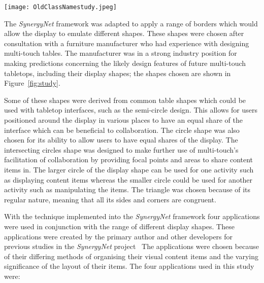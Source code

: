 \documentclass[review,5p,times,twocolumn]{elsarticle}
\begin{document}
\begin{figure*}[t!] 
	\centerline{\texttt{[image: OldClassNamestudy.jpeg]}}
	\caption{Several applications in use with different display shapes during the study.}
	\label{fig:study}
\end{figure*}

The {\emph{SynergyNet}} framework was adapted to apply a range of borders which would allow the display to emulate different shapes.
These shapes were chosen after consultation with a furniture manufacturer who had experience with designing multi-touch tables.
The manufacturer was in a strong industry position for making
predictions concerning the likely design features of future multi-touch tabletops, including their display shapes; the shapes chosen are shown in Figure~\ref{fig:study}.

Some of these shapes were derived from common table shapes which could be used with tabletop interfaces, such as the semi-circle design.
This allows for users positioned around the display in various places to have an equal share of the interface which can be beneficial to collaboration.
The circle shape was also chosen for its ability to allow users to have equal shares of the display.
The intersecting circles shape was designed to make further use of multi-touch's facilitation of collaboration by providing focal points and areas to share content items in.
The larger circle of the display shape can be used for one activity such as displaying content items whereas the smaller circle could be used for another activity such as manipulating the items.
The triangle was chosen because of its regular nature, meaning that all its sides and corners are congruent.

With the technique implemented into the {\emph{SynergyNet}} framework four applications were used in conjunction with the range of different display shapes.
These applications were created by the primary author and other developers for previous studies in the {\emph{SynergyNet}} project~\cite{higgins2011}
The applications were chosen because of their differing methods of organising their visual content items and the varying significance of the layout of their items.
The four applications used in this study were:
\end{document}
